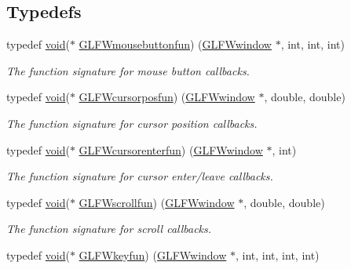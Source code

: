 \subsection*{Typedefs}
\begin{DoxyCompactItemize}
\item 
typedef \mbox{\hyperlink{glad_8h_a950fc91edb4504f62f1c577bf4727c29}{void}}($\ast$ \mbox{\hyperlink{group__input_ga39893a4a7e7c3239c98d29c9e084350c}{G\+L\+F\+Wmousebuttonfun}}) (\mbox{\hyperlink{group__window_ga3c96d80d363e67d13a41b5d1821f3242}{G\+L\+F\+Wwindow}} $\ast$, int, int, int)
\begin{DoxyCompactList}\small\item\em The function signature for mouse button callbacks. \end{DoxyCompactList}\item 
typedef \mbox{\hyperlink{glad_8h_a950fc91edb4504f62f1c577bf4727c29}{void}}($\ast$ \mbox{\hyperlink{group__input_ga4cfad918fa836f09541e7b9acd36686c}{G\+L\+F\+Wcursorposfun}}) (\mbox{\hyperlink{group__window_ga3c96d80d363e67d13a41b5d1821f3242}{G\+L\+F\+Wwindow}} $\ast$, double, double)
\begin{DoxyCompactList}\small\item\em The function signature for cursor position callbacks. \end{DoxyCompactList}\item 
typedef \mbox{\hyperlink{glad_8h_a950fc91edb4504f62f1c577bf4727c29}{void}}($\ast$ \mbox{\hyperlink{group__input_ga51ab436c41eeaed6db5a0c9403b1c840}{G\+L\+F\+Wcursorenterfun}}) (\mbox{\hyperlink{group__window_ga3c96d80d363e67d13a41b5d1821f3242}{G\+L\+F\+Wwindow}} $\ast$, int)
\begin{DoxyCompactList}\small\item\em The function signature for cursor enter/leave callbacks. \end{DoxyCompactList}\item 
typedef \mbox{\hyperlink{glad_8h_a950fc91edb4504f62f1c577bf4727c29}{void}}($\ast$ \mbox{\hyperlink{group__input_ga4687e2199c60a18a8dd1da532e6d75c9}{G\+L\+F\+Wscrollfun}}) (\mbox{\hyperlink{group__window_ga3c96d80d363e67d13a41b5d1821f3242}{G\+L\+F\+Wwindow}} $\ast$, double, double)
\begin{DoxyCompactList}\small\item\em The function signature for scroll callbacks. \end{DoxyCompactList}\item 
typedef \mbox{\hyperlink{glad_8h_a950fc91edb4504f62f1c577bf4727c29}{void}}($\ast$ \mbox{\hyperlink{group__input_ga0192a232a41e4e82948217c8ba94fdfd}{G\+L\+F\+Wkeyfun}}) (\mbox{\hyperlink{group__window_ga3c96d80d363e67d13a41b5d1821f3242}{G\+L\+F\+Wwindow}} $\ast$, int, int, int, int)

\end{DoxyCompactItemize}
